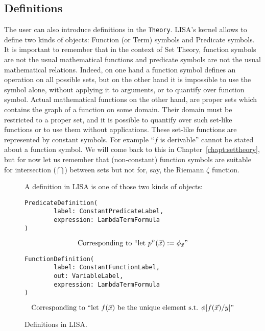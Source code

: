 \subsection{Definitions}
\label{subs:definitions}
The user can also introduce definitions in the \lstinline{Theory}{}. 
LISA's kernel allows to define two kinds of objects: Function (or Term) symbols and Predicate symbols. It is important to remember that in the context of Set Theory, function symbols are not the usual mathematical functions and predicate symbols are not the usual mathematical relations. Indeed, on one hand a function symbol defines an operation on all possible sets, but on the other hand it is impossible to use the symbol alone, without applying it to arguments, or to quantify over function symbol.
Actual mathematical functions on the other hand, are proper sets which contains the graph of a function on some domain. Their domain must be restricted to a proper set, and it is possible to quantify over such set-like functions or to use them without applications. These set-like functions are represented by constant symbols.  For example ``$f$ is derivable'' cannot be stated about a function symbol. We will come back to this in Chapter~\ref{chapt:settheory}, but for now let us remember that (non-constant) function symbols are suitable for intersection ($\bigcap$) between sets but not for, say, the Riemann $\zeta$ function.

\begin{figure}
A definition in LISA is one of those two kinds of objects:
\begin{lstlisting}[frame=single]
PredicateDefinition(
		label: ConstantPredicateLabel,
		expression: LambdaTermFormula
)
\end{lstlisting}
$$
\textnormal{Corresponding to ``let } p^n(\vec{x}) := \phi_{\vec{x}}\textnormal{''}
$$
\begin{lstlisting}[frame=single]
FunctionDefinition(
		label: ConstantFunctionLabel,
		out: VariableLabel, 
		expression: LambdaTermFormula
)
\end{lstlisting}
$$
\textnormal{Corresponding to ``let } f(\vec{x}) \textnormal{ be the unique element s.t. } \phi[f(\vec{x})/y]\textnormal{''}
$$
\caption{Definitions in LISA.}
\label{fig:definitions}
\end{figure}


